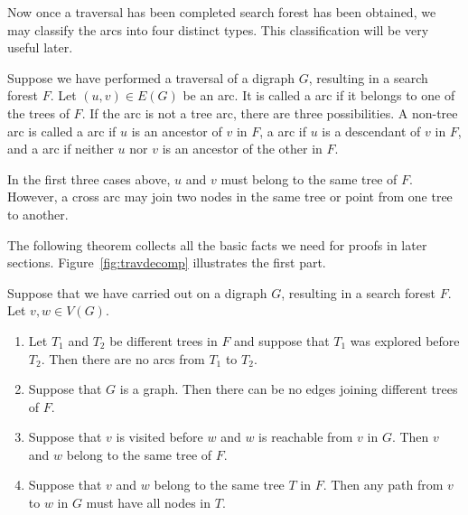 Now once a traversal has been completed search forest has been obtained, we may classify the arcs into four distinct types. This classification will be very useful later.

\begin{Definition}
Suppose we have performed a traversal of a digraph $G$, resulting in a
search forest $F$.  Let $(u, v)\in E(G)$ be an arc. It is called a
 arc if it belongs to one of the trees of $F$. If the arc
is not a tree arc, there are three possibilities.  A non-tree arc is
called a  arc if $u$ is an ancestor of $v$ in $F$, a
 arc if $u$ is a descendant of $v$ in $F$, and a
 arc if neither $u$ nor $v$ is an ancestor of the other in $F$.

\end{Definition} 

\begin{note}

In the first three cases above, $u$ and $v$ must belong to the same
tree of $F$. However, a cross arc may join two nodes in the same tree
or point from one tree to another. 

\end{note}

The following theorem collects all the basic facts we need for proofs in later sections. Figure~\ref{fig:travdecomp} illustrates the first part.


\begin{Theorem}
\label{thm:trav}
Suppose that we have carried out  on a digraph $G$, resulting in a search forest $F$. Let $v, w \in V(G)$.
\begin{enumerate}
\item Let $T_1$ and $T_2$ be different trees in $F$ and suppose that $T_1$ was explored before $T_2$. Then there are no arcs from $T_1$ to $T_2$. 

\item Suppose that $G$ is a graph. Then there can be no edges joining different trees of $F$.

\item Suppose that $v$ is visited before $w$ and $w$ is reachable from $v$ in $G$. Then $v$ and $w$ belong to the same tree of $F$.

\item Suppose that $v$ and $w$ belong to the same tree $T$ in $F$. Then any path from $v$ to $w$ in $G$ must have all nodes in $T$.

\end{enumerate}
\end{Theorem}

